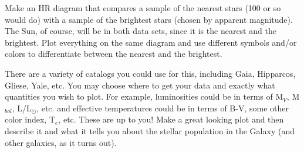 \documentclass[12pt]{article}
\newenvironment{problem}[2][Problem]{\begin{trivlist}
\item[\hskip \labelsep {\bfseries #1}\hskip \labelsep {\bfseries #2.}]}{\end{trivlist}}
\begin{document}
\begin{problem}{3}
  Make an HR diagram that compares a sample of the nearest stars (100 or so would do) with a sample of the brightest stars (chosen by apparent magnitude). The Sun, of course, will be in both data sets, since it is the nearest and the brightest. Plot everything on the same diagram and use different symbols and/or colors to differentiate between the nearest and the brightest.

  There are a variety of catalogs you could use for this, including Gaia, Hipparcos, Gliese, Yale, etc. You may choose where to get your data and exactly what quantities you wish to plot. For example, luminosities could be in terms of M$_V$, M$_{bol}$, L/L$_\odot$, etc. and effective temperatures could be in terms of B-V, some other color index, T$_e$, etc. These are up to you! Make a great looking plot and then describe it and what it tells you about the stellar population in the Galaxy (and other galaxies, as it turns out).
\end{problem}
\end{document}
